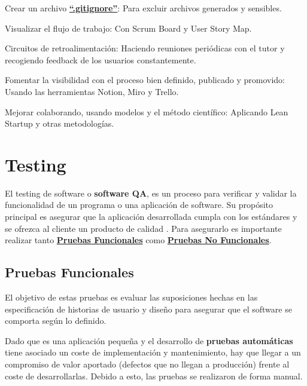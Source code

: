 \documentclass[12pt,twoside,titlepage]{report}
\begin{document}
\begin{compactitem}
    \item Crear un archivo \href{https://github.com/alberttogoca/EarFit/blob/main/.gitignore}{\textbf{``.gitignore''}}: Para excluir archivos generados y sensibles.
    \item Visualizar el flujo de trabajo: Con Scrum Board y User Story Map.
    \item Circuitos de retroalimentación: Haciendo reuniones periódicas con el tutor y recogiendo feedback de los usuarios constantemente.
    \item Fomentar la visibilidad con el proceso bien definido, publicado y promovido: Usando las herramientas Notion, Miro y Trello.
    \item Mejorar colaborando, usando modelos y el método científico: Aplicando Lean Startup y otras metodologías.
\end{compactitem}

\section{Testing}
\label{sec:pruebas}

El testing de software o \textbf{software QA}, es un proceso para verificar y validar la funcionalidad de un programa o una aplicación de software. Su propósito principal es asegurar que la aplicación desarrollada cumpla con los estándares y se ofrezca al cliente un producto de calidad
\cite{testing}. Para asegurarlo es importante realizar tanto \hyperref[sec:funcionales]{\textbf{Pruebas Funcionales}} como \hyperref[sec:nofuncionales]{\textbf{Pruebas No Funcionales}}.

\subsection{Pruebas Funcionales}
\label{sec:funcionales}

El objetivo de estas pruebas es evaluar las suposiciones hechas en las especificación de historias de usuario y diseño para asegurar que el software se comporta según lo definido.

Dado que es una aplicación pequeña y el desarrollo de \textbf{pruebas automáticas} tiene asociado un coste de implementación y mantenimiento, hay que llegar a un compromiso de valor aportado (defectos que no llegan a producción) frente al coste de desarrollarlas. Debido a esto, las pruebas se realizaron de forma manual. 
\end{document}
